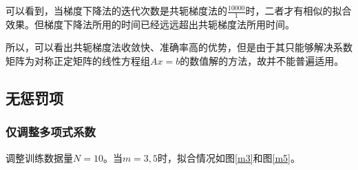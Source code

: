 可以看到，当梯度下降法的迭代次数是共轭梯度法的$\frac{10000}{1}$时，二者才有相似的拟合效果。但梯度下降法所用的时间已经远远超出共轭梯度法所用时间。

所以，可以看出共轭梯度法收敛快、准确率高的优势，但是由于其只能够解决系数矩阵为对称正定矩阵的线性方程组$A x = b$的数值解的方法，故并不能普遍适用。

\subsection{无惩罚项}

\subsubsection{仅调整多项式系数}

调整训练数据量$N = 10$。当$m = 3, 5$时，拟合情况如图\ref{m3}和图\ref{m5}。

